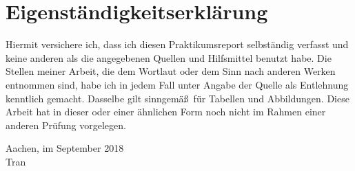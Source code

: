 	
	
	\section*{Eigenst\"andigkeitserkl\"arung}
	Hiermit versichere ich, dass ich diesen Praktikumsreport selbst\"andig verfasst und keine anderen als die angegebenen Quellen und Hilfsmittel benutzt habe. Die Stellen meiner Arbeit, die dem Wortlaut oder dem Sinn nach anderen Werken entnommen sind, habe ich in jedem Fall unter Angabe der Quelle als Entlehnung kenntlich gemacht. Dasselbe gilt sinngem\"a\ss ~f\"ur Tabellen und Abbildungen. Diese Arbeit hat in dieser oder einer \"ahnlichen Form noch nicht im Rahmen einer anderen Pr\"ufung vorgelegen.
	\vspace{6mm}
	\begin{flushright}
	Aachen, im September 2018
	\\[12mm]
	Tran
	\end{flushright}
	\newpage
